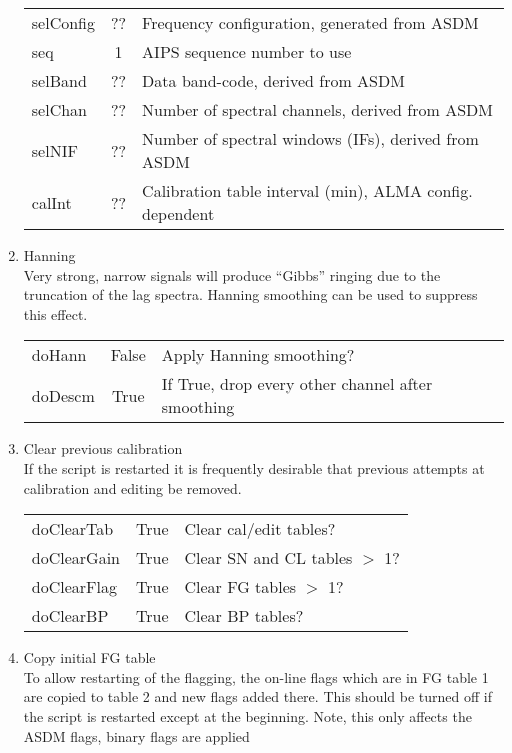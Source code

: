 \documentclass[11pt]{article}
\begin{document}
\begin{enumerate}
\begin{center}
\begin{tabular}{|l|c|l|}
selConfig  & ?? &  Frequency configuration, generated from ASDM\\
seq     & 1 &  AIPS sequence number to use \\
selBand & ??  &  Data band-code, derived from ASDM\\
selChan & ??  &  Number of spectral channels, derived from ASDM\\
selNIF  & ??  &  Number of spectral windows (IFs), derived from ASDM\\
calInt  & ??  &  Calibration table interval (min), ALMA config. dependent\\
\hline
\end{tabular}
\end{center}
%
\item Hanning \\
Very strong, narrow signals will produce ``Gibbs'' ringing
due to the truncation of the lag spectra.
Hanning smoothing can be used to suppress this effect.
\begin{center}
\begin{tabular}{|l|c|l|}
\hline
doHann  & False &  Apply Hanning smoothing? \\
doDescm & True  & If True, drop every other channel after smoothing  \\
\hline
\end{tabular}
\end{center}
%
\item Clear previous calibration\\
If the script is restarted it is frequently desirable that previous
attempts at calibration and editing be removed.
\begin{center}
\begin{tabular}{|l|c|l|}
\hline
doClearTab   & True & Clear cal/edit tables? \\
doClearGain  & True & Clear SN and CL tables $>$ 1? \\
doClearFlag  & True & Clear FG tables $>$ 1? \\
doClearBP    & True & Clear BP tables? \\
\hline
\end{tabular}
\end{center}
%
\item Copy initial FG table \\
To allow restarting of the flagging, the on-line flags which are in FG
table 1 are copied to table 2 and new flags added there.
This should be turned off if the script is restarted except at the
beginning.
Note, this only affects the ASDM flags, binary flags are applied

\end{enumerate}
\end{document}
